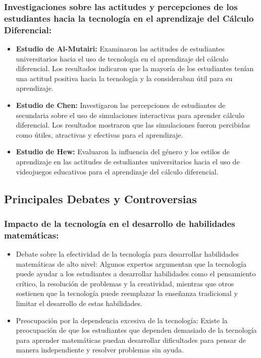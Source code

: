\documentclass{article}
\begin{document}
\subsubsection{Investigaciones sobre las actitudes y percepciones de los estudiantes hacia la tecnología en el aprendizaje del Cálculo Diferencial:}
\begin{itemize}
  \item \textbf{Estudio de Al-Mutairi:} Examinaron las actitudes de estudiantes universitarios hacia el uso de tecnología en el aprendizaje del cálculo diferencial. Los resultados indicaron que la mayoría de los estudiantes tenían una actitud positiva hacia la tecnología y la consideraban útil para su aprendizaje.
  \item \textbf{Estudio de Chen:} Investigaron las percepciones de estudiantes de secundaria sobre el uso de simulaciones interactivas para aprender cálculo diferencial. Los resultados mostraron que las simulaciones fueron percibidas como útiles, atractivas y efectivas para el aprendizaje.
  \item \textbf{Estudio de Hew:} Evaluaron la influencia del género y los estilos de aprendizaje en las actitudes de estudiantes universitarios hacia el uso de videojuegos educativos para el aprendizaje del cálculo diferencial.
\end{itemize}

\subsection{Principales Debates y Controversias}
\subsubsection{Impacto de la tecnología en el desarrollo de habilidades matemáticas:}
\begin{itemize}
  \item Debate sobre la efectividad de la tecnología para desarrollar habilidades matemáticas de alto nivel: Algunos expertos argumentan que la tecnología puede ayudar a los estudiantes a desarrollar habilidades como el pensamiento crítico, la resolución de problemas y la creatividad, mientras que otros sostienen que la tecnología puede reemplazar la enseñanza tradicional y limitar el desarrollo de estas habilidades.
  \item Preocupación por la dependencia excesiva de la tecnología: Existe la preocupación de que los estudiantes que dependen demasiado de la tecnología para aprender matemáticas puedan desarrollar dificultades para pensar de manera independiente y resolver problemas sin ayuda.
\end{itemize}
\end{document}
